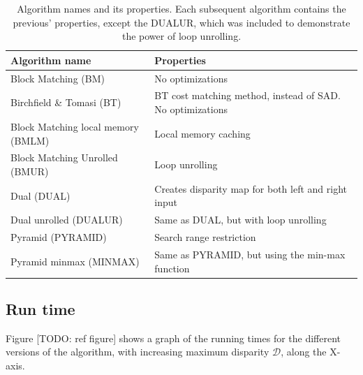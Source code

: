 \begin{table}
  \begin{tabular}{|l|l|}
    \hline
    Algorithm name                     & Properties                                               \\
    \hline
    Block Matching (BM)                & No optimizations                                         \\
    Birchfield \& Tomasi (BT)          & BT cost matching method, instead of SAD. No optimizations\\
    Block Matching local memory (BMLM) & Local memory caching                                     \\
    Block Matching Unrolled (BMUR)     & Loop unrolling                                           \\
    Dual (DUAL)                        & Creates disparity map for both left and right input      \\
    Dual unrolled (DUALUR)             & Same as DUAL, but with loop unrolling                    \\
    Pyramid (PYRAMID)                  & Search range restriction                                 \\
    Pyramid minmax (MINMAX)            & Same as PYRAMID, but using the min-max function          \\
    \hline
  \end{tabular}
  \caption{Algorithm names and its properties. Each subsequent
    algorithm contains the previous' properties, except the DUALUR,
    which was included to demonstrate the power of loop unrolling.}
  \label{algorithm-name-table}
\end{table}


\subsection{Run time}

Figure [TODO: ref figure] shows a graph of the running times for the
different versions of the algorithm, with increasing maximum disparity
$\mathcal{D}$, along the X-axis.



